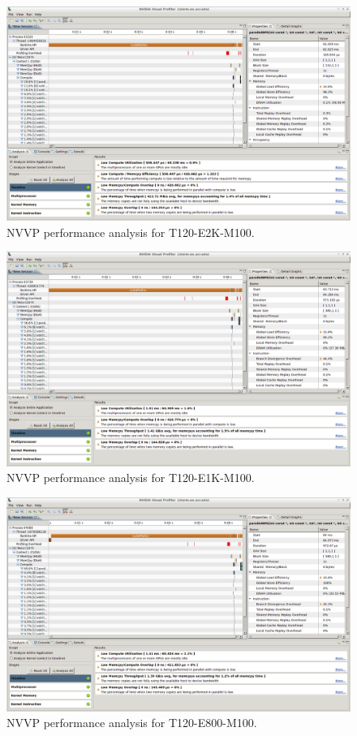 \documentclass[10pt]{scrartcl}
\begin{document}
 \begin{figure}[h!]
  \centering
  \includegraphics[width=\textwidth]{figures/nvvp_T120-E2K-M100.png}
  \caption{NVVP performance analysis for T120-E2K-M100.}\label{fig:nvvp_T120-E2K-M100}
 \end{figure}

 \begin{figure}[h!]
  \centering
  \includegraphics[width=\textwidth]{figures/nvvp_T120-E1K-M100.png}
  \caption{NVVP performance analysis for T120-E1K-M100.}\label{fig:nvvp_T120-E1K-M100}
 \end{figure}

 \begin{figure}[h!]
  \centering
  \includegraphics[width=\textwidth]{figures/nvvp_T120-E800-M100.png}
  \caption{NVVP performance analysis for T120-E800-M100.}\label{fig:nvvp_T120-E800-M100}
 \end{figure}
\end{document}
